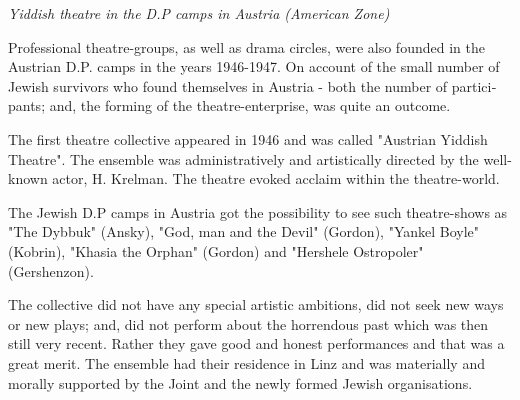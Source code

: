 \documentclass{article}
\begin{document}
\begin{pairs}
\begin{Leftside}
\begin{english}
\beginnumbering
\autopar
\emph{
Yiddish theatre in the D.P camps in Austria (American Zone)
}
\newline 
 
Professional theatre-groups, as well as drama circles, were also founded in the Austrian D.P. camps in the years 1946-1947.
On account of the small number of Jewish survivors who found themselves in Austria - both the number of participants; and, the forming of
the theatre-enterprise, was quite an outcome.

The first theatre collective appeared in 1946 and was called "Austrian Yiddish Theatre". The ensemble was administratively and 
artistically directed by the well-known actor, H. Krelman. The theatre evoked acclaim within the theatre-world.

The Jewish D.P camps in Austria got the possibility to see such theatre-shows as "The Dybbuk" (Ansky),
"God, man and the Devil" (Gordon), "Yankel Boyle" (Kobrin), "Khasia the Orphan" (Gordon) and "Hershele Ostropoler" (Gershenzon).

The collective did not have any special artistic ambitions, did not seek new ways or new plays; and, did not perform about the horrendous past which was then still
very recent. Rather they gave good and honest performances and that was a great merit. The ensemble had their residence in Linz and was materially and morally
supported by the Joint and the newly formed Jewish organisations.

\endnumbering
\end{english}
\end{Leftside}

\end{pairs}
\Columns
\end{document}
